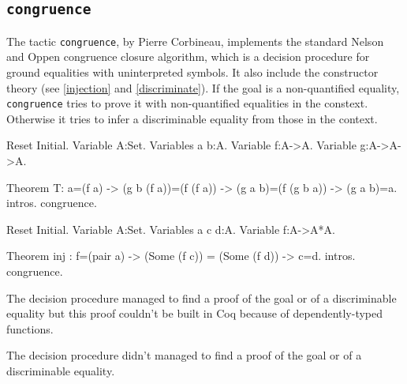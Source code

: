 
\subsection{\tt congruence}
\label{congruence}

The tactic {\tt congruence}, by Pierre Corbineau, implements the standard Nelson and Oppen
congruence closure algorithm, which is a decision procedure for ground
equalities with uninterpreted symbols. It also include the constructor theory
(see \ref{injection} and \ref{discriminate}).
If the goal is a non-quantified equality, {\tt congruence} tries to
prove it with non-quantified equalities in the constext. Otherwise it
tries to infer a discriminable equality from those in the context.

\begin{coq_eval}
Reset Initial.
Variable A:Set.
Variables a b:A.
Variable f:A->A.
Variable g:A->A->A.
\end{coq_eval}

\begin{coq_example}
Theorem T: 
  a=(f a) -> (g b (f a))=(f (f a)) -> (g a b)=(f (g b a)) -> (g a b)=a.
intros.
congruence.
\end{coq_example}

\begin{coq_eval}
Reset Initial.
Variable A:Set.
Variables a c d:A.
Variable f:A->A*A.
\end{coq_eval}

\begin{coq_example}
Theorem inj : f=(pair a) -> (Some (f c)) = (Some (f d)) -> c=d.
intros.
congruence.
\end{coq_example}

\begin{ErrMsgs}
  \item {}
    The decision procedure managed to find a proof of the goal or of
    a discriminable equality but this proof couldn't be built in Coq
    because of dependently-typed functions.
  \item {}
    The decision procedure didn't managed to find a proof of the goal or of
    a discriminable equality.
\end{ErrMsgs}

